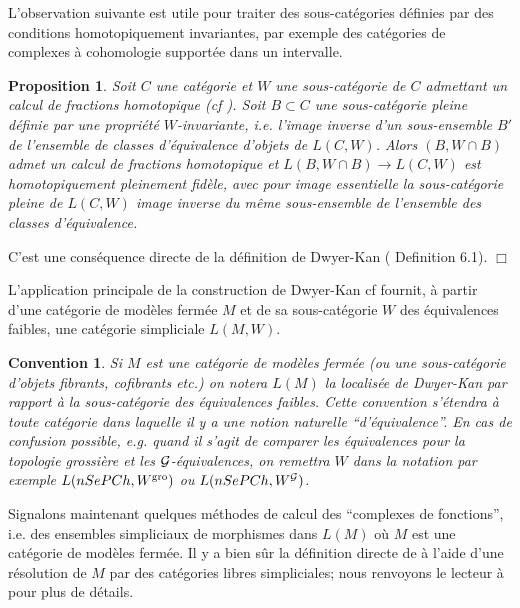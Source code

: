 \documentclass[12pt]{article}
\newcommand{\eop}{\hfill $\Box$\vspace{.1in}}
\newtheorem{proposition}[lemma]{Proposition}
\newtheorem{convention}[lemma]{Convention}
\newcommand{\Gg}{{\cal G}}
\begin{document}
L'observation suivante est utile pour traiter des sous-cat\'egories
d\'efinies par des conditions homotopiquement invariantes, par
exemple des cat\'egories de complexes \`a cohomologie support\'ee dans un
intervalle.

\begin{proposition}
\label{stabilite}
Soit $C$ une cat\'egorie et $W$ une sous-cat\'egorie de $C$ admettant un
calcul de
fractions homotopique
(cf \cite{GabrielZisman}).
Soit $B\subset C$ une sous-cat\'egorie pleine d\'efinie
par une propri\'et\'e $W$-invariante, i.e. l'image inverse d'un sous-ensemble
$B'$ de l'ensemble de classes d'\'equivalence d'objets de $L(C,W)$.
Alors $(B, W\cap B)$ admet un calcul de fractions homotopique et $L(B, W\cap
B)\rightarrow L(C,W)$ est homotopiquement pleinement fid\`ele, avec pour image
essentielle la sous-cat\'egorie pleine de $L(C,W)$ image inverse du m\^eme
sous-ensemble de l'ensemble des classes d'\'equivalence.
\end{proposition}
C'est une cons\'equence directe de la d\'efinition de Dwyer-Kan
(\cite{DwyerKan2} Definition 6.1).
\eop

L'application principale de la construction de Dwyer-Kan cf \cite{DwyerKan2}
fournit, \`a partir d'une
cat\'egorie de mod\`eles ferm\'ee $M$ et de sa
sous-cat\'egorie $W$ des \'equivalences faibles, une cat\'egorie
simpliciale $L(M,W)$.

\begin{convention}
\label{convenir}
Si $M$ est une cat\'egorie de mod\`eles ferm\'ee
(ou une sous-cat\'egorie d'ob\-jets fibrants, cofibrants etc.) on notera
$L(M)$ la localis\'ee de Dwyer-Kan par rapport \`a la sous-cat\'egorie des
\'equivalences faibles. Cette convention s'\'etendra \`a toute cat\'egorie dans
laquelle il y a une notion naturelle ``d'\'equivalence''. En cas de confusion
possible, e.g. quand il s'agit de comparer les \'equivalences pour la topologie
grossi\`ere et les $\Gg$-\'equivalences, on remettra $W$ dans la  notation par
exemple $L(nSePCh, W^{\rm gro})$ ou $L(nSePCh, W^{\Gg})$.
\end{convention}



Signalons maintenant quelques m\'ethodes de calcul des ``complexes de
fonctions'', i.e. des ensembles simpliciaux de morphismes dans $L(M)$ o\`u $M$
est une cat\'egorie de mod\`eles ferm\'ee.
Il y a bien s\^ur la d\'efinition directe de \cite{DwyerKan1} \`a l'aide d'une
r\'esolution de $M$ par des cat\'egories libres simpliciales;
nous renvoyons le
lecteur \`a \cite{DwyerKan1} pour plus de d\'etails.
\end{document}
